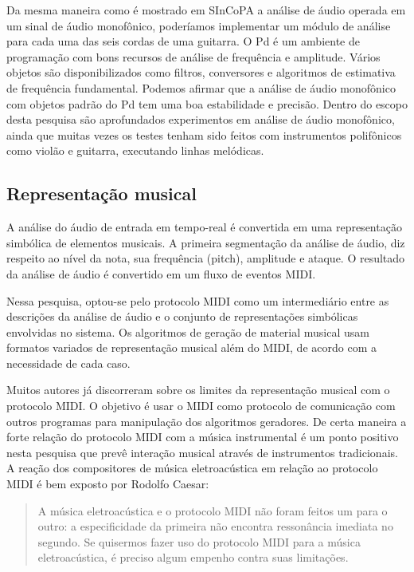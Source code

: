 \documentclass{ppgmus}
\begin{document}
Da mesma maneira como é mostrado em SInCoPA a análise de áudio operada em um sinal de áudio
monofônico, poderíamos implementar um módulo de análise para cada uma das seis cordas de uma guitarra.
O Pd é um ambiente de programação com bons recursos de análise de frequência e amplitude. Vários
objetos são disponibilizados como filtros, conversores e algoritmos de estimativa de frequência fundamental.
Podemos afirmar que a análise de áudio monofônico com objetos padrão do Pd tem uma boa estabilidade e
precisão. Dentro do escopo desta pesquisa são aprofundados experimentos em análise de áudio monofônico,
ainda que muitas vezes os testes tenham sido feitos com instrumentos polifônicos como violão e 
guitarra, executando linhas melódicas.


 
\subsection{Representação musical}

A análise do áudio de entrada em tempo-real é convertida em uma representação simbólica de 
elementos musicais. A primeira segmentação da análise
de áudio, diz respeito ao nível da nota, sua frequência (pitch),
amplitude e ataque. O resultado da análise de áudio é convertido
em um fluxo de eventos MIDI.

Nessa pesquisa, optou-se pelo protocolo MIDI como um intermediário
entre as descrições da análise de áudio e o conjunto de representações
simbólicas envolvidas no sistema. Os algoritmos de geração
de material musical usam formatos variados de representação musical 
além do MIDI, de acordo com a necessidade de cada caso.

Muitos autores já discorreram sobre os limites da representação musical
com o protocolo MIDI. O objetivo é usar o MIDI como protocolo de comunicação
com outros programas para manipulação dos algoritmos geradores.
De certa maneira a forte relação do protocolo MIDI com a música instrumental
é um ponto positivo nesta pesquisa que prevê interação musical através de 
instrumentos tradicionais. 
A reação dos compositores de música eletroacústica em relação ao protocolo MIDI
é bem exposto por Rodolfo Caesar:

\begin{quote}
A música eletroacústica e o protocolo MIDI não foram feitos um para o outro: a especificidade da 
primeira não encontra ressonância imediata no segundo. Se quisermos fazer uso do protocolo MIDI 
para a música eletroacústica, é preciso algum empenho contra suas limitações. \cite{caesarcopa} 
\end{quote}
\end{document}
